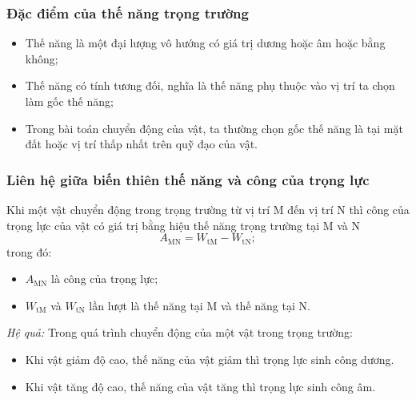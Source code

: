 \subsubsection{Đặc điểm của thế năng trọng trường}

\begin{itemize}
	\item Thế năng là một đại lượng vô hướng có giá trị dương hoặc âm hoặc bằng không;
	\item Thế năng có tính tương đối, nghĩa là thế năng phụ thuộc vào vị trí ta chọn làm gốc thế năng;
	\item Trong bài toán chuyển động của vật, ta thường chọn gốc thế năng là tại mặt đất hoặc vị trí thấp nhất trên quỹ đạo của vật.
\end{itemize}

\subsubsection{Liên hệ giữa biến thiên thế năng và công của trọng lực}

Khi một vật chuyển động trong trọng trường từ vị trí M đến vị trí N thì công của trọng lực của vật có giá trị bằng hiệu thế năng trọng trường tại M và N
\begin{equation*}
	A_\text{MN}=W_{\text{tM}}-W_{\text{tN}};
\end{equation*}
trong đó:
\begin{itemize}
	\item $A_\text{MN}$ là công của trọng lực;
	\item $W_{\text{tM}}$ và $W_{\text{tN}}$ lần lượt là thế năng tại M và thế năng tại N.
\end{itemize}

\textit{Hệ quả:} Trong quá trình chuyển động của một vật trong trọng trường:

\begin{itemize}
	\item Khi vật giảm độ cao, thế năng của vật giảm thì trọng lực sinh công dương.
	\item Khi vật tăng độ cao, thế năng của vật tăng thì trọng lực sinh công âm.
\end{itemize}

